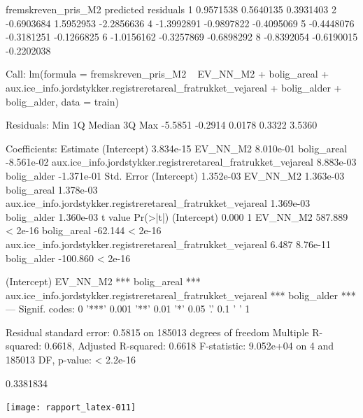 \documentclass{report}
\begin{document}
\begin{Schunk}
\begin{Soutput}
  fremskreven_pris_M2  predicted  residuals
1           0.9571538  0.5640135  0.3931403
2          -0.6903684  1.5952953 -2.2856636
4          -1.3992891 -0.9897822 -0.4095069
5          -0.4448076 -0.3181251 -0.1266825
6          -1.0156162 -0.3257869 -0.6898292
8          -0.8392054 -0.6190015 -0.2202038
\end{Soutput}
\begin{Soutput}
Call:
lm(formula = fremskreven_pris_M2 ~ EV_NN_M2 + bolig_areal + aux.ice_info.jordstykker.registreretareal_fratrukket_vejareal + 
    bolig_alder + bolig_alder, data = train)

Residuals:
    Min      1Q  Median      3Q     Max 
-5.5851 -0.2914  0.0178  0.3322  3.5360 

Coefficients:
                                                                Estimate
(Intercept)                                                    3.834e-15
EV_NN_M2                                                       8.010e-01
bolig_areal                                                   -8.561e-02
aux.ice_info.jordstykker.registreretareal_fratrukket_vejareal  8.883e-03
bolig_alder                                                   -1.371e-01
                                                              Std. Error
(Intercept)                                                    1.352e-03
EV_NN_M2                                                       1.363e-03
bolig_areal                                                    1.378e-03
aux.ice_info.jordstykker.registreretareal_fratrukket_vejareal  1.369e-03
bolig_alder                                                    1.360e-03
                                                               t value Pr(>|t|)
(Intercept)                                                      0.000        1
EV_NN_M2                                                       587.889  < 2e-16
bolig_areal                                                    -62.144  < 2e-16
aux.ice_info.jordstykker.registreretareal_fratrukket_vejareal    6.487 8.76e-11
bolig_alder                                                   -100.860  < 2e-16
                                                                 
(Intercept)                                                      
EV_NN_M2                                                      ***
bolig_areal                                                   ***
aux.ice_info.jordstykker.registreretareal_fratrukket_vejareal ***
bolig_alder                                                   ***
---
Signif. codes:  0 '***' 0.001 '**' 0.01 '*' 0.05 '.' 0.1 ' ' 1

Residual standard error: 0.5815 on 185013 degrees of freedom
Multiple R-squared:  0.6618,	Adjusted R-squared:  0.6618 
F-statistic: 9.052e+04 on 4 and 185013 DF,  p-value: < 2.2e-16
\end{Soutput}
\begin{Soutput}
[1] 0.3381834
\end{Soutput}
\end{Schunk}
\texttt{[image: rapport\_latex-011]}
\end{document}
